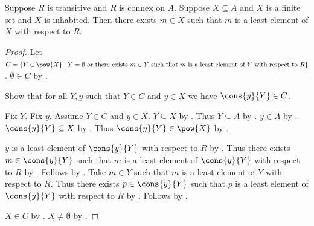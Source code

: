 \begin{theorem}\label{finite_least_element}
    Suppose $R$ is transitive and $R$ is connex on $A$.
    Suppose $X\subseteq A$ and $X$ is a finite set and $X$ is inhabited.
    Then there exists $m\in X$ such that
        $m$ is a least element of $X$ with respect to $R$.
\end{theorem}
\begin{proof}
    Let $C=\{Y\in\pow{X}\mid
        \text{$Y=\emptyset$ or there exists $m\in Y$ such that
            $m$ is a least element of $Y$ with respect to $R$}\}$.
    $\emptyset\in C$ by .

    Show that for all $Y,y$ such that $Y\in C$ and $y\in X$ we have
        $\cons{y}{Y}\in C$.
    \begin{subproof}
        Fix $Y$.
        Fix $y$.
        Assume $Y\in C$ and $y\in X$.
        $Y\subseteq X$ by .
        Thus $Y\subseteq A$ by .
        $y\in A$ by .
        $\cons{y}{Y}\subseteq X$ by .
        Thus $\cons{y}{Y}\in\pow{X}$ by .
        \begin{byCase}
            $y$ is a least element of $\cons{y}{Y}$ with respect to $R$
                by .
            Thus there exists $m\in\cons{y}{Y}$ such that
                $m$ is a least element of $\cons{y}{Y}$ with respect to $R$
                by .
            Follows by \auto.
            Take $m\in Y$ such that
                $m$ is a least element of $Y$ with respect to $R$.
            Thus there exists $p\in\cons{y}{Y}$ such that
                $p$ is a least element of $\cons{y}{Y}$ with respect to $R$
                by .
            Follows by \auto.
        \end{byCase}
    \end{subproof}
    $X\in C$ by .
    $X\neq\emptyset$ by .
\end{proof}

